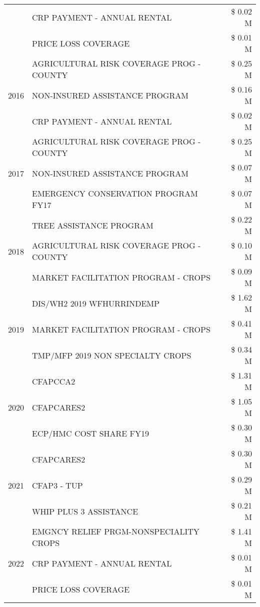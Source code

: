 \begin{tabular}{llr}
 & CRP PAYMENT - ANNUAL RENTAL & \$ 0.02 M \\
 & PRICE LOSS COVERAGE & \$ 0.01 M \\
\cline{1-3}
\multirow[t]{3}{*}{2016} & AGRICULTURAL RISK COVERAGE PROG - COUNTY & \$ 0.25 M \\
 & NON-INSURED ASSISTANCE PROGRAM & \$ 0.16 M \\
 & CRP PAYMENT - ANNUAL RENTAL & \$ 0.02 M \\
\cline{1-3}
\multirow[t]{3}{*}{2017} & AGRICULTURAL RISK COVERAGE PROG - COUNTY & \$ 0.25 M \\
 & NON-INSURED ASSISTANCE PROGRAM & \$ 0.07 M \\
 & EMERGENCY CONSERVATION PROGRAM FY17 & \$ 0.07 M \\
\cline{1-3}
\multirow[t]{3}{*}{2018} & TREE ASSISTANCE PROGRAM & \$ 0.22 M \\
 & AGRICULTURAL RISK COVERAGE PROG - COUNTY & \$ 0.10 M \\
 & MARKET FACILITATION PROGRAM - CROPS & \$ 0.09 M \\
\cline{1-3}
\multirow[t]{3}{*}{2019} & DIS/WH2 2019 WFHURRINDEMP & \$ 1.62 M \\
 & MARKET FACILITATION PROGRAM - CROPS & \$ 0.41 M \\
 & TMP/MFP 2019 NON SPECIALTY CROPS & \$ 0.34 M \\
\cline{1-3}
\multirow[t]{3}{*}{2020} & CFAPCCA2 & \$ 1.31 M \\
 & CFAPCARES2 & \$ 1.05 M \\
 & ECP/HMC COST SHARE FY19 & \$ 0.30 M \\
\cline{1-3}
\multirow[t]{3}{*}{2021} & CFAPCARES2 & \$ 0.30 M \\
 & CFAP3 - TUP & \$ 0.29 M \\
 & WHIP PLUS 3 ASSISTANCE & \$ 0.21 M \\
\cline{1-3}
\multirow[t]{3}{*}{2022} & EMGNCY RELIEF PRGM-NONSPECIALITY CROPS & \$ 1.41 M \\
 & CRP PAYMENT - ANNUAL RENTAL & \$ 0.01 M \\
 & PRICE LOSS COVERAGE & \$ 0.01 M \\
\cline{1-3}
\bottomrule
\end{tabular}
